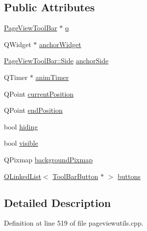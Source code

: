 \subsection*{Public Attributes}
\begin{DoxyCompactItemize}
\item 
\hyperlink{classPageViewToolBar}{Page\+View\+Tool\+Bar} $\ast$ \hyperlink{classToolBarPrivate_a05b6db3d3667cbc748dd957a800eec07}{q}
\item 
Q\+Widget $\ast$ \hyperlink{classToolBarPrivate_afaae01eea9e15a9a88c02cc1a6636528}{anchor\+Widget}
\item 
\hyperlink{classPageViewToolBar_a6410ac0bc9e35fba1314cfd6d7049385}{Page\+View\+Tool\+Bar\+::\+Side} \hyperlink{classToolBarPrivate_ab776848ec81463b3008086418bc55161}{anchor\+Side}
\item 
Q\+Timer $\ast$ \hyperlink{classToolBarPrivate_a2786c7b75009e7a8991fdc67a31251e0}{anim\+Timer}
\item 
Q\+Point \hyperlink{classToolBarPrivate_a6d790f4a41310a7fea33bd59a08df782}{current\+Position}
\item 
Q\+Point \hyperlink{classToolBarPrivate_a511ae41bfbb54824f46f8410414638db}{end\+Position}
\item 
bool \hyperlink{classToolBarPrivate_a8731feac9f140a06f4c99bf61e496f2a}{hiding}
\item 
bool \hyperlink{classToolBarPrivate_a2b0694b3affeb089a09763cc2d91fa56}{visible}
\item 
Q\+Pixmap \hyperlink{classToolBarPrivate_a5f5e42e6d6aebc59080c0f551728cc0b}{background\+Pixmap}
\item 
\hyperlink{classQLinkedList}{Q\+Linked\+List}$<$ \hyperlink{classToolBarButton}{Tool\+Bar\+Button} $\ast$ $>$ \hyperlink{classToolBarPrivate_a3808da7a9dd822effa1fd0961dc84c0e}{buttons}
\end{DoxyCompactItemize}


\subsection{Detailed Description}


Definition at line 519 of file pageviewutils.\+cpp.



